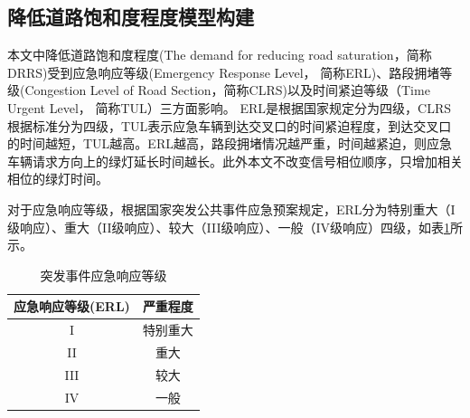 \subsection{降低道路饱和度程度模型构建}

本文中降低道路饱和度程度(The demand for reducing road saturation，简称DRRS)受到应急响应等级(Emergency Response Level， 简称ERL)、路段拥堵等级(Congestion Level of Road Section，简称CLRS)以及时间紧迫等级（Time Urgent Level， 简称TUL）三方面影响。
ERL是根据国家规定\cite{erl_2019}分为四级，CLRS根据标准\cite{GA_T_115_2020}分为四级，TUL表示应急车辆到达交叉口的时间紧迫程度，到达交叉口的时间越短，TUL越高。ERL越高，路段拥堵情况越严重，时间越紧迫，则应急车辆请求方向上的绿灯延长时间越长。此外本文不改变信号相位顺序，只增加相关相位的绿灯时间。



对于应急响应等级，根据国家突发公共事件应急预案规定\cite{erl_2019}，ERL分为特别重大（I级响应）、重大（II级响应）、较大（III级响应）、一般（IV级响应）四级，如表\ref{table:ERL}所示。
\begin{table}[H]
	\centering
	\caption{突发事件应急响应等级}
	\label{table:ERL}
	\begin{tabular}{|c|c|}
		\hline
		应急响应等级(ERL) & 严重程度 \\ \hline
		I & 特别重大 \\ \hline
		II & 重大 \\ \hline
		III & 较大 \\ \hline
		IV & 一般 \\ \hline
	\end{tabular}
\end{table}



